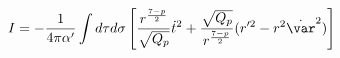 \begin{equation}
I = - \frac{1}{4\pi\alpha'}\int d\tau d\sigma \left[ 
\frac{r^{\frac{7-p}{2}}}{\sqrt{Q_p}}\dot{t}^2 + \frac{\sqrt{Q_p}}
{r^{\frac{7-p}{2}}}( r'^2 - r^2\dot{\var}^2 ) \right]
\end{equation}

